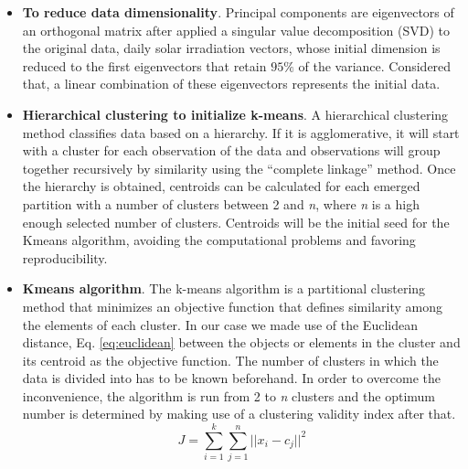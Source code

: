 \begin{itemize}
\item \textbf{To reduce data dimensionality}. Principal components are eigenvectors of an orthogonal matrix after applied a singular value decomposition (SVD) to the original data, daily solar irradiation vectors, whose initial dimension is reduced to the first eigenvectors that retain $95\%$ of the variance. Considered that, a linear combination of these eigenvectors represents the initial data.
\item \textbf{Hierarchical clustering to initialize k-means}. A hierarchical clustering method classifies data based on a hierarchy. If it is agglomerative, it will start with a cluster for each observation of the data and observations will group together recursively by similarity using the “complete linkage” method. Once the hierarchy is obtained, centroids can be calculated for each emerged partition with a number of clusters between 2 and \textit{n}, where \textit{n} is a high enough selected number of clusters. Centroids will be the initial seed for the Kmeans algorithm, avoiding the computational problems and favoring reproducibility.
\item \textbf{Kmeans algorithm}. The k-means algorithm is a partitional clustering method that minimizes an objective function that defines similarity among the elements of each cluster. In our case we made use of the Euclidean distance, Eq. \ref{eq:euclidean} between the objects or elements in the cluster and its centroid as the objective function. The number of clusters in which the data is divided into has to be known beforehand. In order to overcome the inconvenience, the algorithm is run from 2 to \textit{n} clusters and the optimum number is determined by making use of a clustering validity index after that.
\begin{equation}\label{eq:euclidean}
    J =\sum_{i=1}^{k}\sum_{j=1}^{n}{||x_i-c_j||}^2
\end{equation}




\end{itemize}
